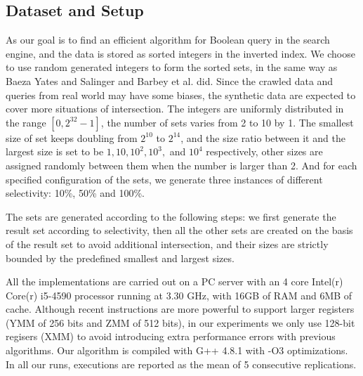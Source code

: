\documentclass[runningheads,a4paper]{llncs}
\begin{document}
\subsection{Dataset and Setup}
As our goal is to find an efficient algorithm for Boolean query in the search engine, and the data is stored as sorted integers in the inverted index.
We choose to use random generated integers to form the sorted sets, in the same way as Baeza Yates and Salinger \cite{Baezayates2005Experimental} and Barbey et al. \cite{J2010An} did.
Since the crawled data and queries from real world may have some biases, the synthetic data are expected to cover more situations of intersection.
The integers are uniformly distributed in the range $ [0,2^{32}-1] $, the number of sets varies from 2 to 10 by 1.
The smallest size of set keeps doubling from $ 2^{10} $ to $ 2^{14} $, and the size ratio between it and the largest size is set to be  $ 1, 10, 10^2, 10^3,$ and $ 10^4 $ respectively, other sizes are assigned randomly between them when the number is larger than 2.
And for each specified configuration of the sets, we generate three instances of different selectivity: 10\%, 50\% and 100\%.

The sets are generated according to the following steps: we first generate the result set according to selectivity, then all the other sets are created on the basis of the result set to avoid additional intersection, and their sizes are strictly bounded by the predefined smallest and largest sizes.

All the implementations are carried out on a PC server with an 4 core Intel(r) Core(r) i5-4590 processor running at 3.30 GHz, with 16GB of RAM and 6MB of cache.
Although recent instructions are more powerful to support larger registers (YMM of 256 bits and ZMM of 512 bits), in our experiments we only use 128-bit regisers (XMM) to avoid introducing extra performance errors with previous algorithms.
Our algorithm is compiled with G++ 4.8.1 with -O3 optimizations. In all our runs, executions are reported as the mean of 5 consecutive replications.
\end{document}
